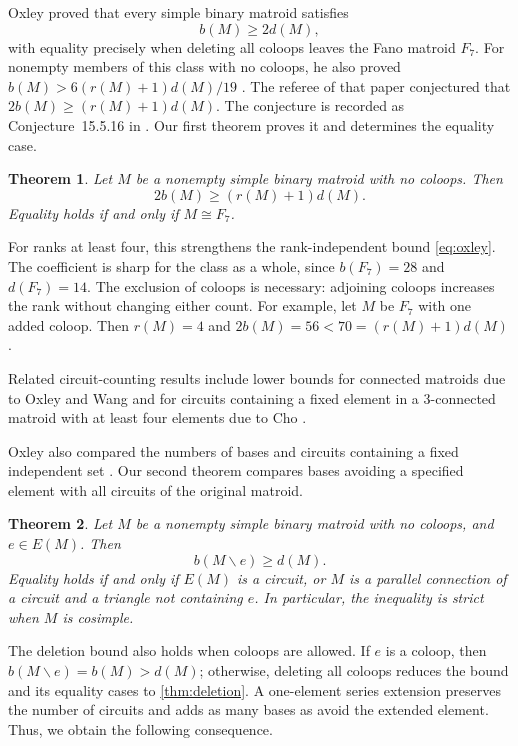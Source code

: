 \documentclass[11pt]{article}
\numberwithin{equation}{section}
\newtheorem{theorem}{Theorem}[section]
\begin{document}
Oxley \cite[Theorem~2.1]{Oxley1983} proved that every simple binary
matroid satisfies
\begin{equation}\label{eq:oxley}
 b(M)\ge2d(M),
\end{equation}
with equality precisely when deleting all coloops leaves the Fano
matroid \(F_7\). For nonempty members of this class with no coloops,
he also proved \(b(M)>6(r(M)+1)d(M)/19\)
\cite[Theorem~3.1]{Oxley1983}. The referee of that paper conjectured
that \(2b(M)\ge(r(M)+1)d(M)\).
The conjecture is recorded as Conjecture~15.5.16 in \cite{Oxley2011}.
Our first theorem proves it and determines the equality case.

\begin{theorem}\label{thm:rank}
Let \(M\) be a nonempty simple binary matroid with no coloops. Then
\[
 2b(M)\ge(r(M)+1)d(M).
\]
Equality holds if and only if \(M\cong F_7\).
\end{theorem}

For ranks at least four, this strengthens the rank-independent bound
\eqref{eq:oxley}. The coefficient is sharp for the class as a whole,
since \(b(F_7)=28\) and \(d(F_7)=14\).
The exclusion of coloops is necessary: adjoining coloops increases
the rank without changing either count. For example, let \(M\) be
\(F_7\) with one added coloop. Then \(r(M)=4\) and
\(2b(M)=56<70=(r(M)+1)d(M)\).

Related circuit-counting results include lower bounds for connected
matroids due to Oxley and Wang \cite[Lemmas~13 and~14]{OxleyWang2019}
and for circuits containing a fixed element in a \(3\)-connected matroid
with at least four elements due to Cho \cite[Theorem~3.4.1]{Cho2026}.

Oxley also compared the numbers of bases and circuits containing
a fixed independent set \cite[Theorem~1.3]{Oxley1983}.
Our second theorem compares bases avoiding a specified element with
all circuits of the original matroid.

\begin{theorem}\label{thm:deletion}
Let \(M\) be a nonempty simple binary matroid with no coloops, and \(e\in E(M)\). Then
\[
 b(M\backslash e)\ge d(M).
\]
Equality holds if and only if \(E(M)\) is a circuit, or \(M\) is a
parallel connection of a circuit and a triangle not containing \(e\).
In particular, the inequality is strict
when \(M\) is cosimple.
\end{theorem}

The deletion bound also holds when coloops are allowed. If \(e\) is
a coloop, then \(b(M\backslash e)=b(M)>d(M)\); otherwise, deleting
all coloops reduces the bound and its equality cases to
\autoref{thm:deletion}.
A one-element series extension preserves the number of circuits
and adds as many bases as avoid the extended element. Thus, we obtain
the following consequence.
\end{document}

